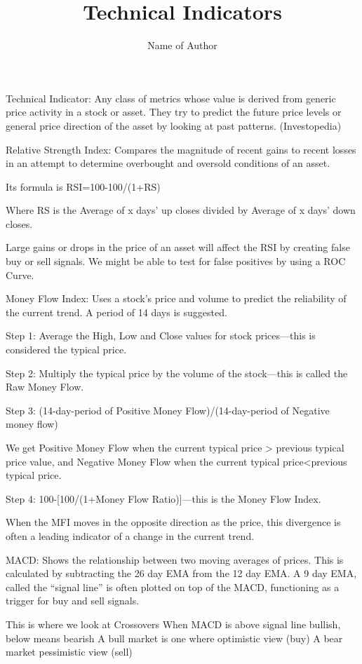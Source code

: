 \documentclass{article}
\title{Technical Indicators}
\author{Name of Author}
\begin{document}
\maketitle

Technical Indicator:  Any class of metrics whose value is derived from generic price activity in a stock or asset.  They try to predict the future price levels or general price direction of the asset by looking at past patterns. (Investopedia)


Relative Strength Index:  Compares the magnitude of recent gains to recent losses in an attempt to determine overbought and oversold conditions of an asset.


Its formula is
RSI=100-100/(1+RS)


Where RS is the Average of x days’ up closes divided by Average of x days’ down closes.


Large gains or drops in the price of an asset will affect the RSI by creating false buy or sell signals.  We might be able to test for false positives by using a ROC Curve.


Money Flow Index:  Uses a stock’s price and volume to predict the reliability of the current trend. A period of 14 days is suggested.


Step 1:  Average the High, Low and Close values for stock prices—this is considered the typical price.


Step 2:  Multiply the typical price by the volume of the stock—this is called the Raw Money Flow.


Step 3:  (14-day-period of Positive Money Flow)/(14-day-period of Negative money flow)


	We get Positive Money Flow when the current typical price > previous typical price value, and Negative Money Flow when the current typical price<previous typical price.
    
    
Step 4:  100-[100/(1+Money Flow Ratio)]—this is the Money Flow Index.


When the MFI moves in the opposite direction as the price, this divergence is often a leading indicator of a change in the current trend.


MACD:  Shows the relationship between two moving averages of prices.  This is calculated by subtracting the 26 day EMA from the 12 day EMA.  A 9 day EMA, called the “signal line” is often plotted on top of the MACD, functioning as a trigger for buy and sell signals.


This is where we look at Crossovers
When MACD is above signal line bullish, below means bearish
A bull market is one where optimistic view (buy)
A bear market pessimistic view (sell)
\end{document}
